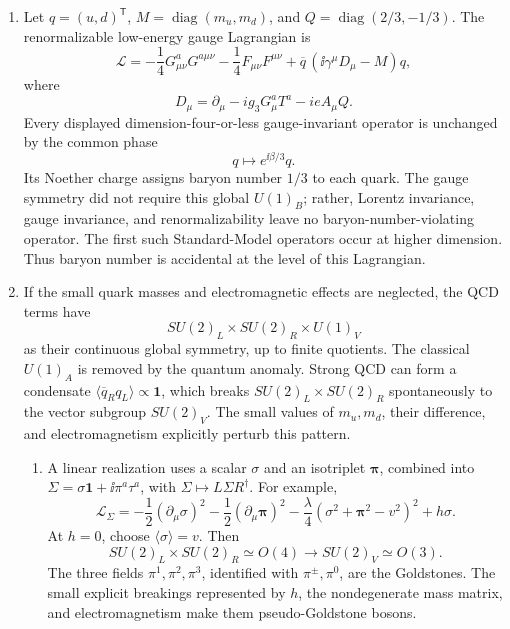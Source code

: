 \begin{enumerate}
\begin{enumerate}
    \item[(b)]
    Let \(q=(u,d)^{\mathsf T}\),
    \(M=\operatorname{diag}(m_u,m_d)\), and
    \(Q=\operatorname{diag}(2/3,-1/3)\).  The renormalizable low-energy
    gauge Lagrangian is
    \[
      \boxed{
      \mathcal L=-\frac14G^a_{\mu\nu}G^{a\mu\nu}
        -\frac14F_{\mu\nu}F^{\mu\nu}
        +\overline q\,(\ii\gamma^\mu D_\mu-M)q,}
    \]
    where
    \[
      D_\mu=\partial_\mu-ig_3G_\mu^aT^a-ieA_\mu Q.
    \]
    Every displayed dimension-four-or-less gauge-invariant operator is
    unchanged by the common phase
    \[
      q\longmapsto e^{\ii\beta/3}q.
    \]
    Its Noether charge assigns baryon number \(1/3\) to each quark.  The
    gauge symmetry did not require this global \(U(1)_B\); rather, Lorentz
    invariance, gauge invariance, and renormalizability leave no
    baryon-number-violating operator.  The first such Standard-Model
    operators occur at higher dimension.  Thus baryon number is accidental
    at the level of this Lagrangian.

    \item[(c)]
    If the small quark masses and electromagnetic effects are neglected,
    the QCD terms have
    \[
      SU(2)_L\times SU(2)_R\times U(1)_V
    \]
    as their continuous global symmetry, up to finite quotients.  The
    classical \(U(1)_A\) is removed by the quantum anomaly.  Strong QCD can
    form a condensate
    \(\langle\overline q_Rq_L\rangle\propto\mathbf1\), which breaks
    \(SU(2)_L\times SU(2)_R\) spontaneously to the vector subgroup
    \(SU(2)_V\).  The small values of \(m_u,m_d\), their difference, and
    electromagnetism explicitly perturb this pattern.

    \begin{enumerate}
      \item[(i)]
      A linear realization uses a scalar \(\sigma\) and an isotriplet
      \(\boldsymbol\pi\), combined into
      \(\Sigma=\sigma\mathbf1+\ii\pi^a\tau^a\), with
      \(\Sigma\mapsto L\Sigma R^\dagger\).  For example,
      \[
        \mathcal L_\Sigma
          =-\frac12(\partial_\mu\sigma)^2
           -\frac12(\partial_\mu\boldsymbol\pi)^2
           -\frac\lambda4
             (\sigma^2+\boldsymbol\pi^2-v^2)^2+h\sigma.
      \]
      At \(h=0\), choose \(\langle\sigma\rangle=v\).  Then
      \[
        SU(2)_L\times SU(2)_R\simeq O(4)
          \longrightarrow SU(2)_V\simeq O(3).
      \]
      The three fields \(\pi^1,\pi^2,\pi^3\), identified with
      \(\pi^\pm,\pi^0\), are the Goldstones.  The small explicit breakings
      represented by \(h\), the nondegenerate mass matrix, and
      electromagnetism make them pseudo-Goldstone bosons.


\end{enumerate}
\end{enumerate}
\end{enumerate}
